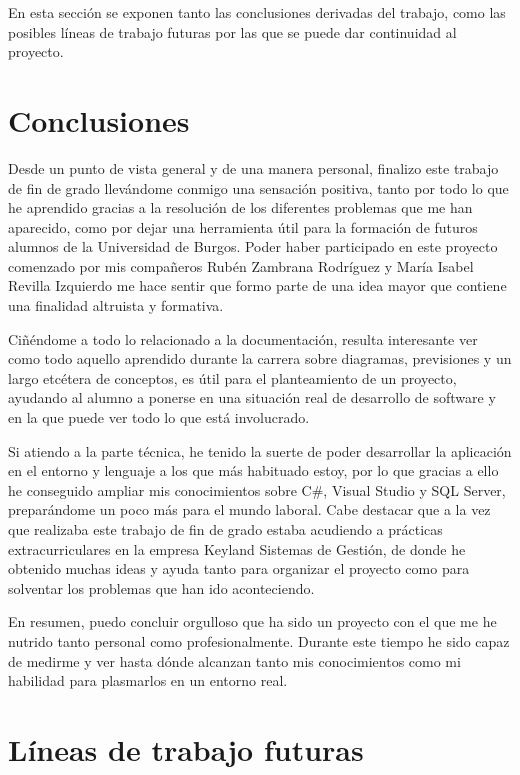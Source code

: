 
En esta sección se exponen tanto las conclusiones derivadas del trabajo, como las posibles líneas de trabajo futuras por las que se puede dar continuidad al proyecto. 

\section{Conclusiones}

Desde un punto de vista general y de una manera personal, finalizo este trabajo de fin de grado llevándome conmigo una sensación positiva, tanto por todo lo que he aprendido gracias a la resolución de los diferentes problemas que me han aparecido, como por dejar una herramienta útil  para la formación de futuros alumnos de la Universidad de Burgos. Poder haber participado en este proyecto comenzado por mis compañeros Rubén Zambrana Rodríguez y María Isabel Revilla Izquierdo me hace sentir que formo parte de una idea mayor que contiene una finalidad altruista y formativa.

Ciñéndome a todo lo relacionado a la documentación, resulta interesante ver como todo aquello aprendido durante la carrera sobre diagramas, previsiones y un largo etcétera de conceptos, es útil para el planteamiento de un proyecto, ayudando al alumno a ponerse en una situación real de desarrollo de software y en la que puede ver todo lo que está involucrado.

Si atiendo a la parte técnica, he tenido la suerte de poder desarrollar la aplicación en el entorno y lenguaje a los que más habituado estoy, por lo que gracias a ello he conseguido ampliar mis conocimientos sobre C\#, Visual Studio y SQL Server, preparándome un poco más para el mundo laboral. Cabe destacar que a la vez que realizaba este trabajo de fin de grado estaba acudiendo a prácticas extracurriculares en la empresa Keyland Sistemas de Gestión, de donde he obtenido muchas ideas y ayuda tanto para organizar el proyecto como para solventar los problemas que han ido aconteciendo.

En resumen, puedo concluir orgulloso que ha sido un proyecto con el que me he nutrido tanto personal como profesionalmente. Durante este tiempo he sido capaz de medirme y ver hasta dónde alcanzan tanto mis conocimientos como mi habilidad para plasmarlos en un entorno real.

\section{Líneas de trabajo futuras}

